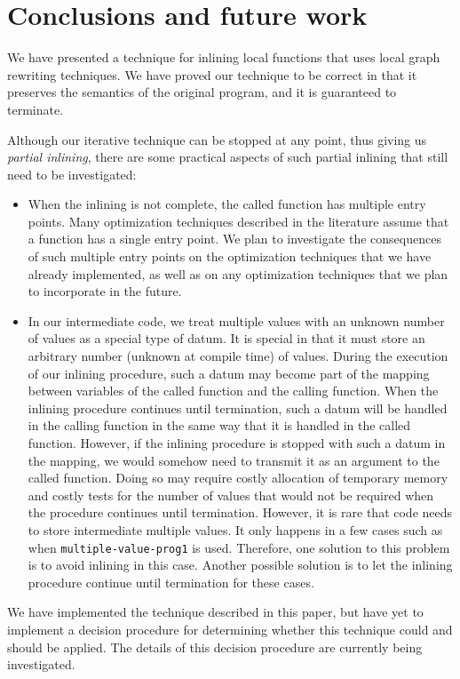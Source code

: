 \section{Conclusions and future work}
\label{sec-conclusions}

We have presented a technique for inlining local functions that uses
local graph rewriting techniques.  We have proved our technique to be
correct in that it preserves the semantics of the original program,
and it is guaranteed to terminate.

Although our iterative technique can be stopped at any point, thus
giving us \emph{partial inlining}, there are some practical aspects of
such partial inlining that still need to be investigated:

\begin{itemize}
\item When the inlining is not complete, the called function has
  multiple entry points.  Many optimization techniques described in
  the literature assume that a function has a single entry point.  We
  plan to investigate the consequences of such multiple entry points
  on the optimization techniques that we have already implemented, as
  well as on any optimization techniques that we plan to incorporate
  in the future.
\item In our intermediate code, we treat multiple values with an
  unknown number of values as a special type of datum.  It is special
  in that it must store an arbitrary number (unknown at compile time)
  of values.  During the execution of our inlining procedure, such a
  datum may become part of the mapping between variables of the called
  function and the calling function.  When the inlining procedure
  continues until termination, such a datum will be handled in the
  calling function in the same way that it is handled in the called
  function.  However, if the inlining procedure is stopped with such a
  datum in the mapping, we would somehow need to transmit it as an
  argument to the called function.  Doing so may require costly
  allocation of temporary memory and costly tests for the number of
  values that would not be required when the procedure continues until
  termination.  However, it is rare that code needs to store
  intermediate multiple values.  It only happens in a few cases such
  as when \texttt{multiple-value-prog1} is used.  Therefore, one
  solution to this problem is to avoid inlining in this case.  Another
  possible solution is to let the inlining procedure continue until
  termination for these cases.
\end{itemize}

We have implemented the technique described in this paper, but have
yet to implement a decision procedure for determining whether this
technique could and should be applied.  The details of this decision
procedure are currently being investigated.
